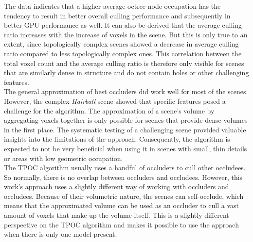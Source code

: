 \noindent
The data indicates that a higher average octree node occupation has the tendency to result in better overall culling 
performance and subsequently in better \ac{GPU} performance as well. It can also be derived that the average culling 
ratio increases with the increase of voxels in the scene. But this is only true to an extent, since topologically 
complex scenes showed a decrease in average culling ratio compared to less topologically complex ones. This correlation 
between the total voxel count and the average culling ratio is therefore only visible for scenes that are similarly 
dense in structure and do not contain holes or other challenging features. \\

\noindent
The general approximation of best occluders did work well for most of the scenes. However, the complex \emph{Hairball} 
scene showed that specific features posed a challenge for the algorithm. The approximation of a scene's volume by 
aggregating voxels together is only possible for scenes that provide dense volumes in the first place. The systematic 
testing of a challenging scene provided valuable insights into the limitations of the approach. Consequently, the 
algorithm is expected to not be very beneficial when using it in scenes with small, thin details or areas with low 
geometric occupation.\\

\noindent
The \ac{TPOC} algorithm usually uses a handful of occluders to cull other occludees. So normally, there is no overlap 
between occluders and occludees. However, this work's approach uses a slightly different way of working with occluders 
and occludees. Because of their volumetric nature, the scenes can self-occlude, which means that the approximated volume 
can be used as an occluder to cull a vast amount of voxels that make up the volume itself. This is a slightly different 
perspective on the \ac{TPOC} algorithm and makes it possible to use the approach when there is only one model present. \\

